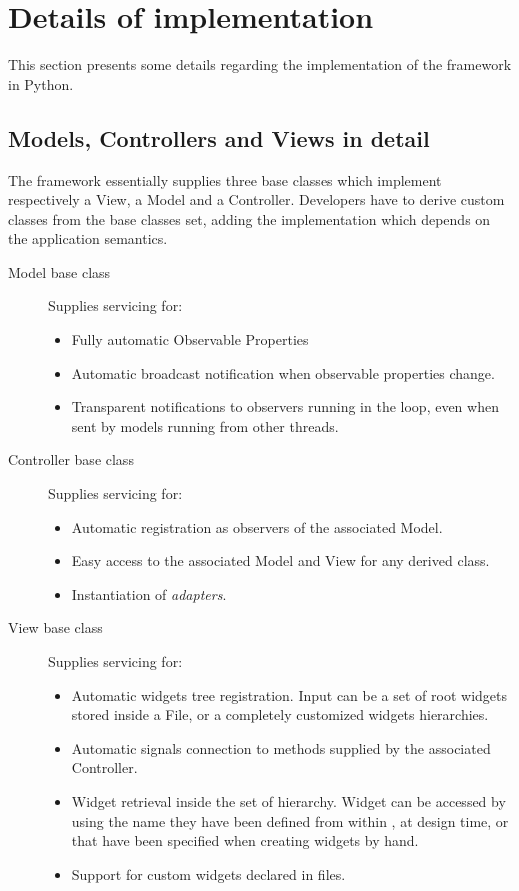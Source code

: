 
\section{\label{DI}Details of implementation}
This section presents some details regarding the implementation of the
\mvco framework in Python.

\subsection{Models, Controllers and Views in detail}
The \mvco framework essentially supplies three base classes which
implement respectively a View, a Model and a Controller.  Developers
have to derive custom classes from the base classes set, adding the
implementation which depends on the application semantics.

\begin{description}

\item[Model base class] Supplies servicing for:
 \begin{itemize} 
 \item Fully automatic Observable Properties 
 \item Automatic broadcast notification when observable properties
 change.
 \item Transparent notifications to observers running in the \pygtk
   loop, even when sent by models running from other threads.
 \end{itemize}

\item[Controller base class] Supplies servicing for:
 \begin{itemize} 
 \item Automatic registration as observers of the associated Model.
 \item Easy access to the associated Model and View for any derived
   class.
 \item Instantiation of \emph{adapters}.
 \end{itemize}

\item[View base class] Supplies servicing for:
 \begin{itemize} 
 \item Automatic widgets tree registration. Input can be a set of root
 widgets stored inside a \glade File, or a completely customized widgets
 hierarchies.
 \item Automatic signals connection to methods supplied by the
 associated Controller.
\item Widget retrieval inside the set of hierarchy. Widget can be
  accessed by using the name they have been defined from within
  \glade, at design time, or that have been specified when creating
  widgets by hand.
\item Support for custom widgets declared in \glade files.
 \end{itemize}

\end{description}


